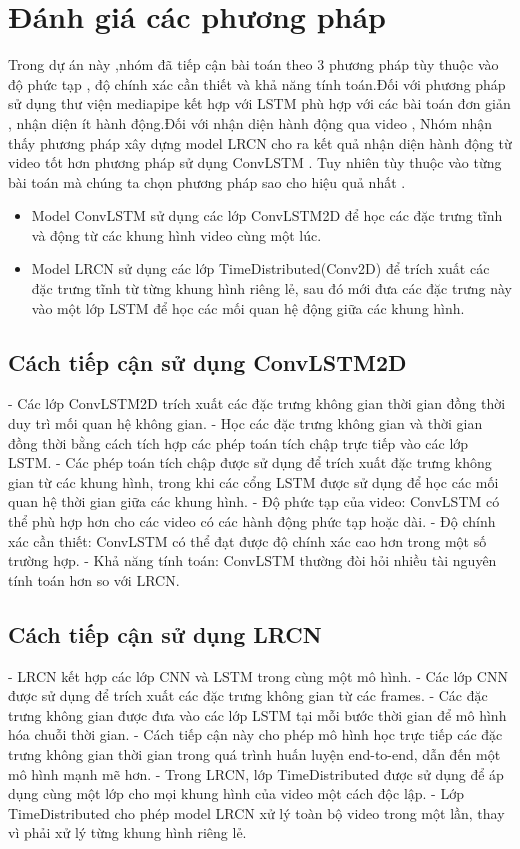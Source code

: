 \section{Đánh giá các phương pháp}

Trong dự án này ,nhóm đã tiếp cận bài toán theo 3 phương pháp tùy thuộc vào độ phức tạp , độ chính xác cần thiết và khả năng tính toán.Đối với phương pháp sử dụng thư viện mediapipe kết hợp với LSTM phù hợp với các bài toán đơn giản , nhận diện ít hành động.Đối với nhận diện hành động qua video , Nhóm nhận thấy phương pháp xây dựng model LRCN cho ra kết quả nhận diện hành động từ video tốt hơn phương pháp sử dụng ConvLSTM . Tuy nhiên tùy thuộc vào từng bài toán mà chúng ta chọn phương pháp sao cho hiệu quả nhất . 

\begin{itemize}
    \item Model ConvLSTM sử dụng các lớp ConvLSTM2D để học các đặc trưng tĩnh và động từ các khung hình video cùng một lúc.
    \item Model LRCN sử dụng các lớp TimeDistributed(Conv2D) để trích xuất các đặc trưng tĩnh từ từng khung hình riêng lẻ, sau đó mới đưa các đặc trưng này vào một lớp LSTM để học các mối quan hệ động giữa các khung hình.
\end{itemize}
\subsection{Cách tiếp cận sử dụng ConvLSTM2D}
- Các lớp ConvLSTM2D trích xuất các đặc trưng không gian thời gian đồng thời duy trì mối quan hệ không gian.
- Học các đặc trưng không gian và thời gian đồng thời bằng cách tích hợp các phép toán tích chập trực tiếp vào các lớp LSTM.
- Các phép toán tích chập được sử dụng để trích xuất đặc trưng không gian từ các khung hình, trong khi các cổng LSTM được sử dụng để học các mối quan hệ thời gian giữa các khung hình.
- Độ phức tạp của video: ConvLSTM có thể phù hợp hơn cho các video có các hành động phức tạp hoặc dài.
- Độ chính xác cần thiết: ConvLSTM có thể đạt được độ chính xác cao hơn trong một số trường hợp.
- Khả năng tính toán: ConvLSTM thường đòi hỏi nhiều tài nguyên tính toán hơn so với LRCN.
\subsection{Cách tiếp cận sử dụng LRCN}

- LRCN kết hợp các lớp CNN và LSTM trong cùng một mô hình.
- Các lớp CNN được sử dụng để trích xuất các đặc trưng không gian từ các frames.
- Các đặc trưng không gian được đưa vào các lớp LSTM tại mỗi bước thời gian để mô hình hóa chuỗi thời gian.
- Cách tiếp cận này cho phép mô hình học trực tiếp các đặc trưng không gian thời gian trong quá trình huấn luyện end-to-end, dẫn đến một mô hình mạnh mẽ hơn.
- Trong LRCN, lớp TimeDistributed được sử dụng để áp dụng cùng một lớp cho mọi khung hình của video một cách độc lập.
- Lớp TimeDistributed cho phép model LRCN xử lý toàn bộ video trong một lần, thay vì phải xử lý từng khung hình riêng lẻ.

